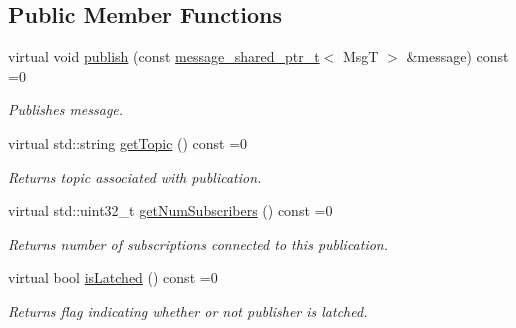 \subsection*{Public Member Functions}
\begin{DoxyCompactItemize}
\item 
virtual void \hyperlink{classflow__ros_1_1routing_1_1_publication_wrapper_a43b9989390bf9f001fe9670a0c1d5897}{publish} (const \hyperlink{namespaceflow__ros_a21a684f38ee2083b3858613317c46d82}{message\+\_\+shared\+\_\+ptr\+\_\+t}$<$ MsgT $>$ \&message) const =0
\begin{DoxyCompactList}\small\item\em Publishes message. \end{DoxyCompactList}\item 
\mbox{\label{classflow__ros_1_1routing_1_1_publication_wrapper_a1aa441bb1846211cb803362233d4ee0b}} 
virtual std\+::string \hyperlink{classflow__ros_1_1routing_1_1_publication_wrapper_a1aa441bb1846211cb803362233d4ee0b}{get\+Topic} () const =0
\begin{DoxyCompactList}\small\item\em Returns topic associated with publication. \end{DoxyCompactList}\item 
\mbox{\label{classflow__ros_1_1routing_1_1_publication_wrapper_a3e2fb2a4cafe729a643af5ed5033dc50}} 
virtual std\+::uint32\+\_\+t \hyperlink{classflow__ros_1_1routing_1_1_publication_wrapper_a3e2fb2a4cafe729a643af5ed5033dc50}{get\+Num\+Subscribers} () const =0
\begin{DoxyCompactList}\small\item\em Returns number of subscriptions connected to this publication. \end{DoxyCompactList}\item 
\mbox{\label{classflow__ros_1_1routing_1_1_publication_wrapper_a86fdc857e02347e862dbbb113e5a6cb6}} 
virtual bool \hyperlink{classflow__ros_1_1routing_1_1_publication_wrapper_a86fdc857e02347e862dbbb113e5a6cb6}{is\+Latched} () const =0
\begin{DoxyCompactList}\small\item\em Returns flag indicating whether or not publisher is latched. \end{DoxyCompactList}\item 

\end{DoxyCompactItemize}
